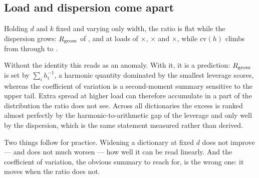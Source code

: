 \subsection{Load and dispersion come apart}

Holding $d$ and $k$ fixed and varying only width, the ratio is flat while the dispersion grows:
$R_{\mathrm{geom}}$ of \SaeLoadOneRgeom, \SaeLoadTwoRgeom{} and \SaeLoadThreeRgeom{} at loads of
\SaeLoadOneLoad$\times$, \SaeLoadTwoLoad$\times$ and \SaeLoadThreeLoad$\times$, while
$\mathrm{cv}(h)$ climbs from \SaeLoadOneCv{} through \SaeLoadTwoCv{} to \SaeLoadThreeCv{}.

Without the identity this reads as an anomaly. With it, it is a prediction: $R_{\mathrm{geom}}$ is set by
$\sum_i h_i^{-1}$, a harmonic quantity dominated by the smallest leverage scores, whereas the
coefficient of variation is a second-moment summary sensitive to the upper tail. Extra spread at
higher load can therefore accumulate in a part of the distribution the ratio does not see. Across all
\SaeDicts{} dictionaries the excess is ranked almost perfectly by the harmonic-to-arithmetic gap of
the leverage and only well by the dispersion, which is the same statement measured rather than
derived.

Two things follow for practice. Widening a dictionary at fixed $d$ does not improve --- and does not
much worsen --- how well it can be read linearly. And the coefficient of variation, the obvious
summary to reach for, is the wrong one: it moves when the ratio does not.

\begin{table}[t]
\centering
\caption{The Interface Diagnostic on \SaeDicts{} released dictionaries, grouped by the axis each
block isolates, with every i.i.d.\ control matched to the shape and operating sparsity of the block
it judges. $s$ is the dictionary's own published operating sparsity. The
\emph{trained against randomly initialised} block is a matched intervention rather than an
observation: both arms come from the same recipe, data and layers, and differ only in whether the
underlying model was trained. Generated from \texttt{results/sae/derived/sae\_axes.json}; the SHA-256
of every checkpoint analysed is recorded there.}
\label{tab:sae}
\small

\end{table}

